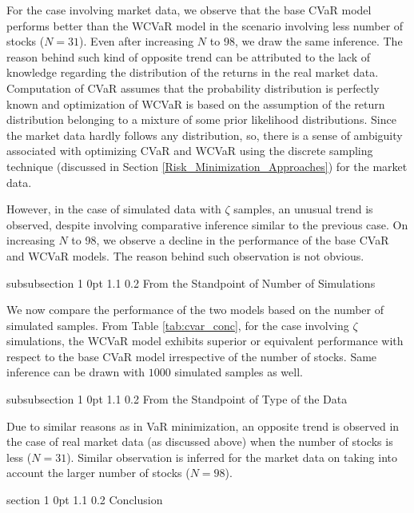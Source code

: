 \documentclass[12pt]{article}
\makeatletter
\numberwithin{equation}{section}
\renewcommand{\section}{
  \@startsection
  {section}%
  {1}%
  {0pt}%
  {1.1\baselineskip}%
  {0.2\baselineskip}%
  {\sc \centering}%
}
\renewcommand{\subsubsection}{
  \@startsection
  {subsubsection}%
  {1}%
  {0pt}%
  {1.1\baselineskip}%
  {0.2\baselineskip}%
  {\sc \centering}%
}
\makeatother
\begin{document}
For the case involving market data, we observe that the base CVaR model performs better than the WCVaR model in the scenario involving less number of stocks ($N=31$). Even after increasing $N$ to 98, we draw the same inference. The reason behind such kind of opposite trend can be attributed to the lack of knowledge regarding the distribution of the returns in the real market data. Computation of CVaR assumes that the probability distribution is perfectly known and optimization of WCVaR is based on the assumption of the return distribution belonging to a mixture of some prior likelihood distributions. Since the market data hardly follows any distribution, so, there is a sense of ambiguity associated with optimizing CVaR and WCVaR using the discrete sampling technique (discussed in Section \ref{Risk_Minimization_Approaches}) for the market data.

However, in the case of simulated data with $\zeta$ samples, an unusual trend is observed, despite involving comparative inference similar to the previous case. On increasing $N$ to 98, we observe a decline in the performance of the base CVaR and WCVaR models. The reason behind such observation is not obvious.

\subsubsection{From the Standpoint of Number of Simulations}

We now compare the performance of the two models based on the number of simulated samples. From Table \ref{tab:cvar_conc}, for the case involving $\zeta$ simulations, the WCVaR model exhibits superior or equivalent performance with respect to the base CVaR model irrespective of the number of stocks. Same inference can be drawn with $1000$ simulated samples as well.

\subsubsection{From the Standpoint of Type of the Data}

Due to similar reasons as in VaR minimization, an opposite trend is observed in the case of real market data (as discussed above) when the number of stocks is less ($N=31$). Similar observation is inferred for the market data on taking into account the larger number of stocks ($N=98$).

\section{Conclusion}
\label{Conclusion}
\end{document}

